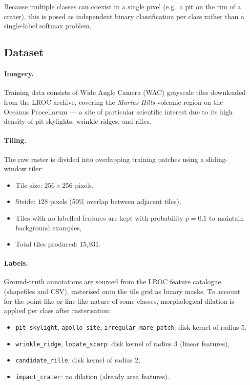 \documentclass{aa}
\begin{document}
\noindent
Because multiple classes can coexist in a single pixel (e.g.\ a pit on the rim of a crater), this is posed as independent binary classification per class rather than a single-label softmax problem.

\subsection{Dataset}
\label{sec:mr_dataset}

\paragraph{Imagery.}
Training data consists of Wide Angle Camera (WAC) grayscale tiles downloaded from the LROC archive, covering the \textit{Marius Hills} volcanic region on the Oceanus Procellarum --- a site of particular scientific interest due to its high density of pit skylights, wrinkle ridges, and rilles.

\paragraph{Tiling.}
The raw raster is divided into overlapping training patches using a sliding-window tiler:
\begin{itemize}
    \item Tile size: $256 \times 256$ pixels,
    \item Stride: $128$ pixels (50\% overlap between adjacent tiles),
    \item Tiles with no labelled features are kept with probability $p=0.1$ to maintain background examples,
    \item Total tiles produced: 15{,}931.
\end{itemize}

\paragraph{Labels.}
Ground-truth annotations are sourced from the LROC feature catalogue (shapefiles and CSV), rasterised onto the tile grid as binary masks. To account for the point-like or line-like nature of some classes, morphological dilation is applied per class after rasterisation:
\begin{itemize}
    \item \texttt{pit\_skylight}, \texttt{apollo\_site}, \texttt{irregular\_mare\_patch}: disk kernel of radius 5,
    \item \texttt{wrinkle\_ridge}, \texttt{lobate\_scarp}: disk kernel of radius 3 (linear features),
    \item \texttt{candidate\_rille}: disk kernel of radius 2,
    \item \texttt{impact\_crater}: no dilation (already area features).
\end{itemize}
\end{document}
